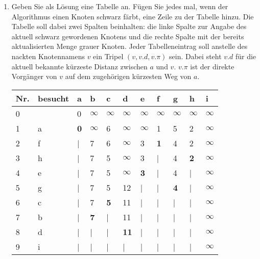 \documentclass{bschlangaul-aufgabe}
\begin{document}
\begin{enumerate}
\begin{enumerate}


\item Geben Sie als Lösung eine Tabelle an. Fügen Sie jedes mal, wenn
der Algorithmus einen Knoten schwarz färbt, eine Zeile zu der Tabelle
hinzu. Die Tabelle soll dabei zwei Spalten beinhalten: die linke Spalte
zur Angabe des aktuell schwarz gewordenen Knotens und die rechte Spalte
mit der bereits aktualisierten Menge grauer Knoten. Jeder
Tabelleneintrag soll anstelle des nackten Knotennamens $v$ ein Tripel
$(v, v.d, v.\pi)$ sein. Dabei steht $v.d$ für die aktuell bekannte
kürzeste Distanz zwischen $a$ und $v$. $v.\pi$ ist der direkte Vorgänger
von $v$ auf dem zugehörigen kürzesten Weg von $a$.

\begin{bAntwort}
\begin{tabular}{lllllllllll}
\bf{Nr.} & \bf{besucht} & \bf{a} & \bf{b} & \bf{c} & \bf{d} & \bf{e} & \bf{f} & \bf{g} & \bf{h} & \bf{i} \\
\hline
0 &   & 0 & $\infty$ & $\infty$ & $\infty$ & $\infty$ & $\infty$ & $\infty$ & $\infty$ & $\infty$ \\
1 & a & \bf{0} & $\infty$ & 6 & $\infty$ & $\infty$ & 1 & 5 & 2 & $\infty$ \\
2 & f & | & 7 & 6 & $\infty$ & 3 & \bf{1} & 4 & 2 & $\infty$ \\
3 & h & | & 7 & 5 & $\infty$ & 3 & | & 4 & \bf{2} & $\infty$ \\
4 & e & | & 7 & 5 & $\infty$ & \bf{3} & | & 4 & | & $\infty$ \\
5 & g & | & 7 & 5 & 12 & | & | & \bf{4} & | & $\infty$ \\
6 & c & | & 7 & \bf{5} & 11 & | & | & | & | & $\infty$ \\
7 & b & | & \bf{7} & | & 11 & | & | & | & | & $\infty$ \\
8 & d & | & | & | & \bf{11} & | & | & | & | & $\infty$ \\
9 & i & | & | & | & | & | & | & | & | & $\infty$ \\
\end{tabular}


\end{bAntwort}
\end{enumerate}
\end{enumerate}
\end{document}
